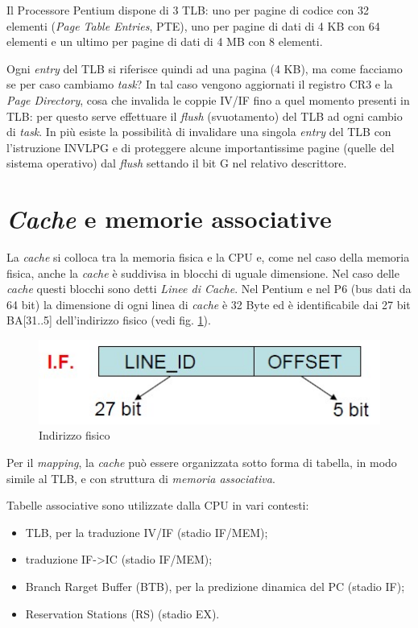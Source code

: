 Il Processore Pentium dispone di 3 TLB: uno per pagine di codice con 32 elementi (\textit{Page Table Entries}, PTE), uno per pagine di dati di 4 KB con 64 elementi e un ultimo per pagine di dati di 4 MB con 8 elementi.

Ogni \textit{entry} del TLB si riferisce quindi ad una pagina (4 KB), ma come facciamo se per caso cambiamo \textit{task}? In tal caso vengono aggiornati il registro CR3 e la \textit{Page Directory}, cosa che invalida le coppie IV/IF fino a quel momento presenti in TLB: per questo serve effettuare il \textit{flush} (svuotamento) del TLB ad ogni cambio di \textit{task}. In più esiste la possibilità di invalidare una singola \textit{entry} del TLB con l'istruzione INVLPG e di proteggere alcune importantissime pagine (quelle del sistema operativo) dal \textit{flush} settando il bit G nel relativo descrittore.

\section{\textit{Cache} e memorie associative}
\label{sec:cache}

La \textit{cache} si colloca tra la memoria fisica e la CPU e, come nel caso della memoria fisica, anche la \textit{cache} è suddivisa in blocchi di uguale dimensione. Nel caso delle \textit{cache} questi blocchi sono detti \textit{Linee di Cache}. Nel Pentium e nel P6 (bus dati da 64 bit) la dimensione di ogni linea di \textit{cache} è 32 Byte ed è identificabile dai 27 bit BA[31..5] dell'indirizzo fisico (vedi fig. \ref{fig:cache2}).

\begin{figure}[!h]
\centering
\includegraphics[width=0.35\columnwidth]{img/cache2}
\caption{Indirizzo fisico}
\label{fig:cache2}
\end{figure}

Per il \textit{mapping}, la \textit{cache} può essere organizzata sotto forma di tabella, in modo simile al TLB, e con struttura di\textit{ memoria associativa}.

Tabelle associative sono utilizzate dalla CPU in vari contesti:
\begin{itemize}
\item TLB, per la traduzione IV/IF (stadio IF/MEM);
\item traduzione IF->IC (stadio IF/MEM);
\item Branch Rarget Buffer (BTB), per la predizione dinamica del PC (stadio IF);
\item Reservation Stations (RS) (stadio EX).
\end{itemize}

